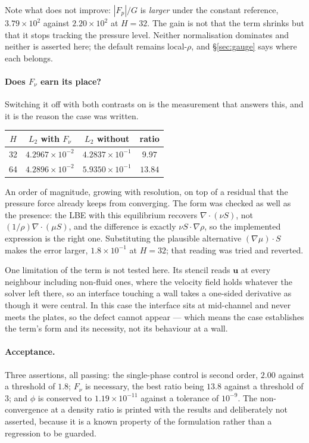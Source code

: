 \documentclass[11pt,a4paper]{article}
\newcommand{\uu}{\bm{u}}
\newcommand{\e}[1]{\times 10^{#1}}
\begin{document}
\noindent Note what does not improve: $|F_p|/G$ is \emph{larger} under the
constant reference, $3.79\e{2}$ against $2.20\e{2}$ at $H=32$. The gain is not
that the term shrinks but that it stops tracking the pressure level. Neither
normalisation dominates and neither is asserted here; the default remains
local-$\rho$, and \S\ref{sec:gauge} says where each belongs.

\paragraph{Does $F_\nu$ earn its place?} Switching it off with both contrasts on
is the measurement that answers this, and it is the reason the case was written.

\begin{center}\small
\begin{tabular}{cccc}
\toprule
$H$ & $L_2$ with $F_\nu$ & $L_2$ without & ratio \\
\midrule
32 & $4.2967\e{-2}$ & $4.2837\e{-1}$ & $9.97$ \\
64 & $4.2896\e{-2}$ & $5.9350\e{-1}$ & $13.84$ \\
\bottomrule
\end{tabular}
\end{center}

\noindent An order of magnitude, growing with resolution, on top of a residual
that the pressure force already keeps from converging. The form was checked as
well as the presence: the LBE with this equilibrium recovers
$\nabla\!\cdot\!(\nu S)$, not $(1/\rho)\nabla\!\cdot\!(\mu S)$, and the difference
is exactly $\nu S\!\cdot\!\nabla\rho$, so the implemented expression is the right
one. Substituting the plausible alternative $(\nabla\mu)\!\cdot\!S$ makes the
error larger, $1.8\e{-1}$ at $H=32$; that reading was tried and reverted.

One limitation of the term is not tested here. Its stencil reads $\uu$ at every
neighbour including non-fluid ones, where the velocity field holds whatever the
solver left there, so an interface touching a wall takes a one-sided derivative
as though it were central. In this case the interface sits at mid-channel and
never meets the plates, so the defect cannot appear --- which means the case
establishes the term's form and its necessity, not its behaviour at a wall.

\paragraph{Acceptance.} Three assertions, all passing: the single-phase control
is second order, $2.00$ against a threshold of $1.8$; $F_\nu$ is necessary, the
best ratio being $13.8$ against a threshold of $3$; and $\phi$ is conserved to
$1.19\e{-11}$ against a tolerance of $10^{-9}$. The non-convergence at a density
ratio is printed with the results and deliberately not asserted, because it is a
known property of the formulation rather than a regression to be guarded.
\end{document}
